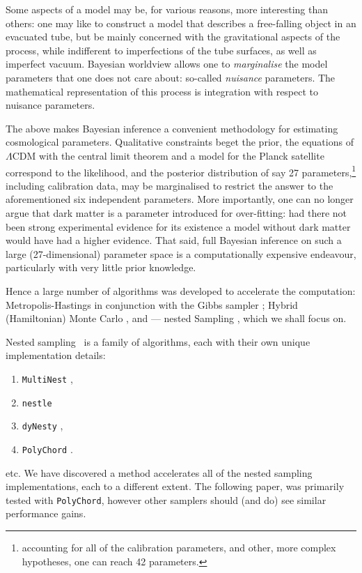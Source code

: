 \documentclass[usenatbib]{mnras}
\begin{document}
Some aspects of a model may be, for various reasons, more
interesting than others: one may like to construct a model that
describes a free-falling object in an evacuated tube, but be mainly
concerned with the gravitational aspects of the process, while
indifferent to imperfections of the tube surfaces, as well as
imperfect vacuum. Bayesian worldview allows one to \emph{marginalise} the
model parameters that one does not care about: so-called \emph{nuisance}
parameters. The mathematical representation of this process is
integration with respect to nuisance parameters. 



The above makes Bayesian inference a convenient methodology for
estimating cosmological parameters. Qualitative constraints beget
the prior, the equations of \(\Lambda\)CDM with the central limit
theorem and a model for the Planck satellite correspond to the
likelihood, and the posterior distribution of say 27
parameters,\footnote{accounting for all of the calibration parameters, and other, more complex hypotheses, one can reach 42 parameters.} including calibration data, may be marginalised to
restrict the answer to the aforementioned six independent
parameters. More importantly, one can no longer argue that dark
matter is a parameter introduced for over-fitting: had there not
been strong experimental evidence for its existence a model without
dark matter would have had a higher evidence. That said, full
Bayesian inference on such a large (27-dimensional) parameter space
is a computationally expensive endeavour, particularly with very
little prior knowledge.

Hence a large number of algorithms was developed to accelerate the
computation: Metropolis-Hastings \citep{Metropolis} in conjunction
with the Gibbs sampler \citep{Metropolis-Hastings-Gibbs}; Hybrid
(Hamiltonian) Monte Carlo \citep{1701.02434,Duane_1987}, and ---
nested Sampling \citep{Skilling2006}, which we shall focus on.

Nested sampling~\cite{Skilling2006} is a family of algorithms, each
with their own unique implementation details:
\begin{enumerate}
\item \texttt{MultiNest} \citep{Feroz2009MultiNestAE},
\item \texttt{nestle} \citep{nestle}
\item \texttt{dyNesty} \citep{Speagle_2020},
\item \texttt{PolyChord} \citep{polychord}.
\end{enumerate}
etc. We have discovered a method accelerates all of the nested sampling
implementations, each to a different extent. The following paper,
was primarily tested with \texttt{PolyChord}, however other samplers should
(and do) see similar performance gains.
\end{document}
